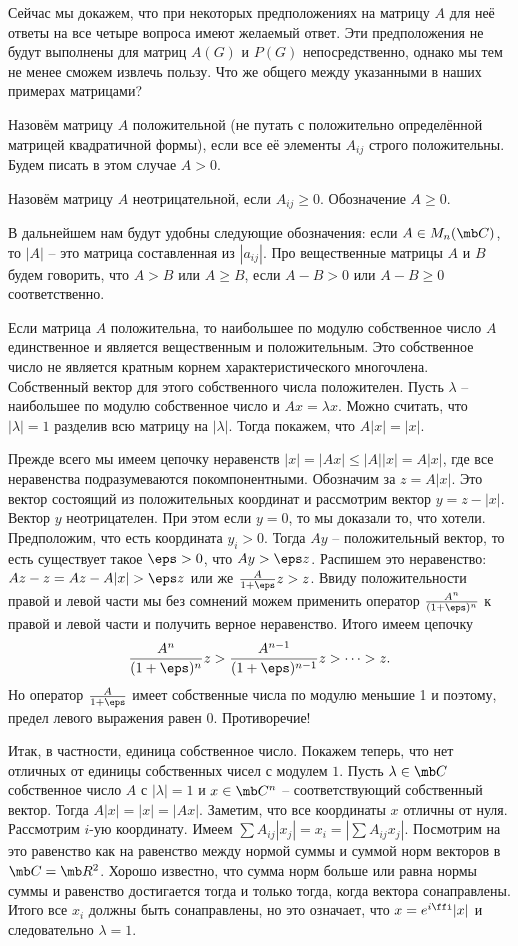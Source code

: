 Сейчас мы докажем, что при некоторых предположениях на матрицу $A$ для неё ответы на все четыре вопроса имеют желаемый ответ. Эти предположения не будут выполнены для матриц $A(G)$ и  $P(G)$ непосредственно, однако мы тем не менее сможем извлечь пользу. Что же общего между указанными в наших примерах матрицами?

\dfn Назовём матрицу $A$ положительной (не путать с положительно определённой матрицей квадратичной формы), если все её элементы $A_{ij}$ строго положительны. Будем писать в этом случае $A>0$.
\edfn

\dfn Назовём матрицу  $A$ неотрицательной, если $A_{ij}\geq 0$. Обозначение $A \geq 0$.
\edfn



\dfn В дальнейшем нам будут удобны следующие обозначения: если $A\in M_n(\mb C)$, то $|A|$ -- это матрица составленная из $|a_{ij}|$. Про вещественные матрицы $A$ и $B$ будем говорить, что $A>B$ или $A\geq B$, если $A-B>0$ или $A-B \geq 0$ соответственно.
\edfn



\thrm[Перрон, 1907] Если матрица $A$ положительна, то наибольшее по модулю собственное число $A$ единственное и является вещественным и положительным. Это собственное число не является кратным корнем характеристического многочлена. Собственный вектор для этого собственного числа положителен.
\ethrm
\proof Пусть $\lambda$ -- наибольшее по модулю собственное число и $Ax=\lambda x$. Можно считать, что $|\lambda|=1$ разделив всю матрицу на $|\lambda|$. Тогда покажем, что $A|x|=|x|$.

Прежде всего мы имеем цепочку неравенств $|x|=|Ax|\leq |A||x|=A|x|$, где все неравенства подразумеваются покомпонентными. Обозначим за $z=A|x|$. Это вектор состоящий из положительных координат и рассмотрим вектор $y=z-|x|$. Вектор $y$ неотрицателен. При этом если $y=0$, то мы доказали то, что хотели. Предположим, что есть координата $y_i>0$. Тогда $Ay$ -- положительный вектор, то есть существует такое $\eps>0$, что $Ay>\eps z$. Распишем это неравенство: $Az - z= Az-A|x|> \eps z$ или же $\frac{A}{1+\eps}z>z$. Ввиду положительности правой и левой части мы без сомнений можем применить оператор $\frac{A^n}{(1+\eps)^n}$ к правой и левой части и получить верное неравенство. Итого имеем цепочку 
$$\frac{A^n}{(1+\eps)^n}z>\frac{A^{n-1}}{(1+\eps)^{n-1}}z> \dots > z.$$
Но оператор $\frac{A}{1+\eps}$ имеет собственные числа по модулю меньшие 1 и поэтому, предел левого выражения равен 0. Противоречие!

Итак, в частности, единица собственное число. Покажем теперь, что нет отличных от единицы собственных чисел с модулем $1$. Пусть $\lambda\in \mb C$ собственное число $A$ с $|\lambda|=1$ и $x \in \mb C^n$ -- соответствующий собственный вектор. Тогда $A|x|=|x|=|Ax|$. Заметим, что все координаты $x$ отличны от нуля. Рассмотрим $i$-ую координату. Имеем $\sum A_{ij}|x_j|=x_i=|\sum A_{ij}x_j|$. Посмотрим на это равенство как на равенство между нормой суммы и суммой норм векторов в $\mb C =\mb R^2$. Хорошо известно, что сумма норм больше или равна нормы суммы и равенство достигается тогда и только тогда, когда вектора сонаправлены. Итого все $x_i$ должны быть сонаправлены, но это означает, что $x=e^{i\ffi} |x|$ и следовательно $\lambda=1$. 

